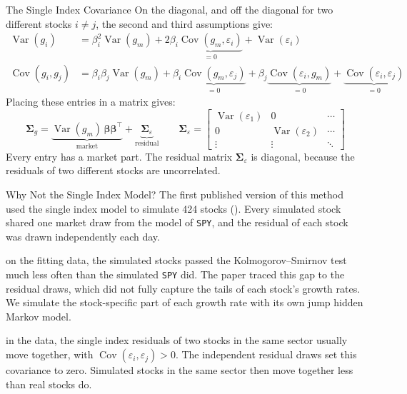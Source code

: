 \documentclass[aspectratio=169,11pt]{beamer}
\begin{document}
\begin{frame}{The Single Index Covariance}
  On the diagonal, and off the diagonal for two different stocks $i\neq j$, the second and third
  assumptions give:
  \begin{align*}
    \operatorname{Var}(g_{i}) &= \beta_{i}^{2}\operatorname{Var}(g_{m})+2\beta_{i}\underbrace{\operatorname{Cov}(g_{m},\varepsilon_{i})}_{=0}+\operatorname{Var}(\varepsilon_{i})\\
    \operatorname{Cov}(g_{i},g_{j}) &= \beta_{i}\beta_{j}\operatorname{Var}(g_{m})+\beta_{i}\underbrace{\operatorname{Cov}(g_{m},\varepsilon_{j})}_{=0}+\beta_{j}\underbrace{\operatorname{Cov}(\varepsilon_{i},g_{m})}_{=0}+\underbrace{\operatorname{Cov}(\varepsilon_{i},\varepsilon_{j})}_{=0}
  \end{align*}
  Placing these entries in a matrix gives:
  \begin{equation*}
    \boxed{\symbf{\Sigma}_{g}=\underbrace{\operatorname{Var}(g_{m})\,\boldsymbol{\beta}\boldsymbol{\beta}^{\top}}_{\textstyle\text{market}}+\underbrace{\symbf{\Sigma}_{\varepsilon}}_{\textstyle\text{residual}}}
    \qquad
    \symbf{\Sigma}_{\varepsilon}=\begin{bmatrix}\operatorname{Var}(\varepsilon_{1}) & 0 & \cdots\\ 0 & \operatorname{Var}(\varepsilon_{2}) & \cdots\\ \vdots & \vdots & \ddots\end{bmatrix}
  \end{equation*}
  Every entry has a market part. The residual matrix $\symbf{\Sigma}_{\varepsilon}$ is diagonal,
  because the residuals of two different stocks are uncorrelated.
\end{frame}

\begin{frame}{Why Not the Single Index Model?}
  The first published version of this method used the single index model to simulate 424 stocks
  (\href{https://arxiv.org/abs/2603.10202}{}). Every simulated
  stock shared one market draw from the model of \texttt{SPY}, and the residual of each stock was
  drawn independently each day.

  \vspace{0.6em}
  \textbf{} on the fitting data, the simulated stocks passed the
  Kolmogorov–Smirnov test much less often than the simulated \texttt{SPY} did. The paper traced
  this gap to the residual draws, which did not fully capture the tails of each stock's growth rates.
  We simulate the stock-specific part of each growth rate with its own jump hidden Markov model.

  \vspace{0.6em}
  \textbf{} in the data, the single index residuals of two stocks in
  the same sector usually move together, with $\operatorname{Cov}(\varepsilon_i,\varepsilon_j)>0$.
  The independent residual draws set this covariance to zero. Simulated stocks in the same sector
  then move together less than real stocks do.
\end{frame}
\end{document}
